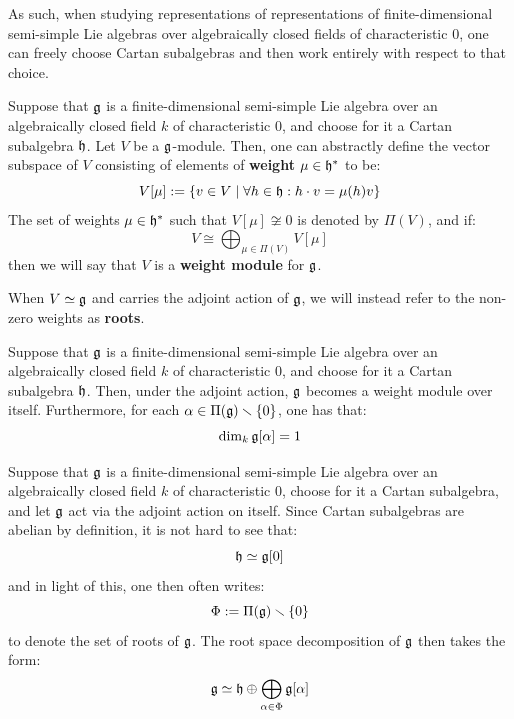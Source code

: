         As such, when studying representations of representations of finite-dimensional semi-simple Lie algebras over algebraically closed fields of characteristic $0$, one can freely choose Cartan subalgebras and then work entirely with respect to that choice. 
        \begin{definition}
            Suppose that $\mathfrak{g}$ is a finite-dimensional semi-simple Lie algebra over an algebraically closed field $k$ of characteristic $0$, and choose for it a Cartan subalgebra $\mathfrak{h}$. Let $V$ be a $\mathfrak{g}$-module. Then, one can abstractly define the vector subspace of $V$ consisting of elements of \textbf{weight} $\mu \in \mathfrak{h}^*$ to be:
                $$V[\mu] := \{v \in V \mid \forall h \in \mathfrak{h}: h \cdot v = \mu(h) v\}$$
            The set of weights $\mu \in \mathfrak{h}^*$ such that $V[\mu] \not \cong 0$ is denoted by $\Pi(V)$, and if:
                $$V \cong \bigoplus_{\mu \in \Pi(V)} V[\mu]$$
            then we will say that $V$ is a \textbf{weight module} for $\mathfrak{g}$. 

            When $V \simeq \mathfrak{g}$ and carries the adjoint action of $\mathfrak{g}$, we will instead refer to the non-zero weights as \textbf{roots}.
        \end{definition}
        \begin{theorem} \label{theorem: root_space_decomposition_for_finite_dimensional_semi_simple_lie_algebras}
            Suppose that $\mathfrak{g}$ is a finite-dimensional semi-simple Lie algebra over an algebraically closed field $k$ of characteristic $0$, and choose for it a Cartan subalgebra $\mathfrak{h}$. Then, under the adjoint action, $\mathfrak{g}$ becomes a weight module over itself. Furthermore, for each $\alpha \in \Pi(\mathfrak{g}) \smallsetminus \{0\}$, one has that:
                $$\dim_k \mathfrak{g}[\alpha] = 1$$
        \end{theorem}
        \begin{convention}
            Suppose that $\mathfrak{g}$ is a finite-dimensional semi-simple Lie algebra over an algebraically closed field $k$ of characteristic $0$, choose for it a Cartan subalgebra, and let $\mathfrak{g}$ act via the adjoint action on itself. Since Cartan subalgebras are abelian by definition, it is not hard to see that:
                $$\mathfrak{h} \simeq \mathfrak{g}[0]$$
            and in light of this, one then often writes:
                $$\Phi := \Pi(\mathfrak{g}) \smallsetminus \{0\}$$
            to denote the set of roots of $\mathfrak{g}$. The root space decomposition of $\mathfrak{g}$ then takes the form:
                $$\mathfrak{g} \simeq \mathfrak{h} \oplus \bigoplus_{\alpha \in \Phi} \mathfrak{g}[\alpha]$$
        \end{convention}
